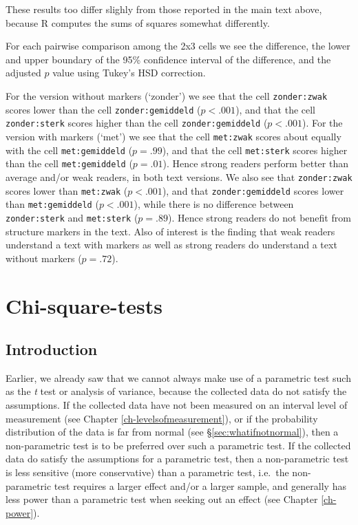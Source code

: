 \documentclass[
]{book}
\begin{document}
These results too differ slighly from those reported in the main text above, because R computes the sums of squares somewhat differently.

For each pairwise comparison among the 2x3 cells we see the difference, the lower and upper boundary of the 95\% confidence interval of the difference, and the adjusted \(p\) value using Tukey's HSD correction.

For the version without markers (`zonder') we see that the cell \texttt{zonder:zwak} scores lower than the cell \texttt{zonder:gemiddeld} (\(p<.001\)), and that the cell \texttt{zonder:sterk} scores higher than the cell \texttt{zonder:gemiddeld} (\(p<.001\)).
For the version with markers (`met') we see that the cell \texttt{met:zwak} scores about equally with the cell \texttt{met:gemiddeld} (\(p=.99\)), and that the cell \texttt{met:sterk} scores higher than the cell \texttt{met:gemiddeld} (\(p=.01\)). Hence strong readers perform better than average and/or weak readers, in both text versions.
We also see that \texttt{zonder:zwak} scores lower than \texttt{met:zwak} (\(p<.001\)),
and that \texttt{zonder:gemiddeld} scores lower than \texttt{met:gemiddeld} (\(p<.001\)),
while there is no difference between \texttt{zonder:sterk} and \texttt{met:sterk} (\(p=.89\)).
Hence strong readers do not benefit from structure markers in the text.
Also of interest is the finding that weak readers understand a text with markers as well as strong readers do understand a text without markers (\(p=.72\)).

\chapter{Chi-square-tests}\label{ch-chi-square-tests}

\section{Introduction}\label{sec:ch16introduction}

Earlier, we already saw that we cannot always make use of a
parametric test such as the \emph{t} test or analysis of variance, because
the collected data do not satisfy the assumptions. If the collected data
have not been measured on an interval level of measurement (see Chapter
\ref{ch-levelsofmeasurement}), or if the probability distribution
of the data is far from normal (see
§\ref{sec:whatifnotnormal}), then a non-parametric test is to be
preferred over such a parametric test. If the collected data
do satisfy the assumptions for a parametric test, then a non-parametric
test is less sensitive (more conservative) than a parametric test, i.e.~the
non-parametric test requires a larger effect and/or a larger sample, and generally
has less power than a parametric test when seeking out an effect
(see Chapter \ref{ch-power}).
\end{document}
